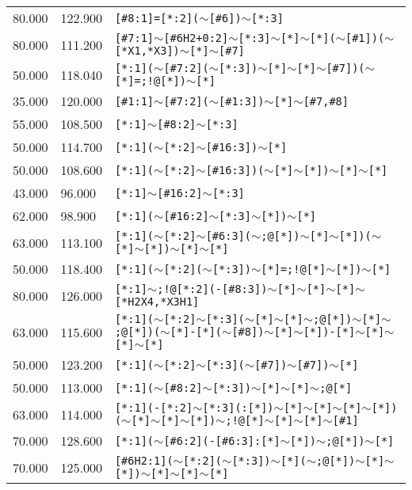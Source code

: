 \begin{longtable}{>{\baselineskip=10pt}p{} >{\baselineskip=10pt}p{} >{\baselineskip=10pt}p{}}
80.000 & 122.900 & \texttt{[\#8:1]=[*:2]($\sim$[\#6])$\sim$[*:3]} \\ 
80.000 & 111.200 & \texttt{[\#7:1]$\sim$[\#6H2+0:2]$\sim$[*:3]$\sim$[*]$\sim$[*]($\sim$[\#1])($\sim$[*X1,*X3])$\sim$[*]$\sim$[\#7]} \\ 
50.000 & 118.040 & \texttt{[*:1]($\sim$[\#7:2]($\sim$[*:3])$\sim$[*]$\sim$[*]$\sim$[\#7])($\sim$[*]=;!@[*])$\sim$[*]} \\ 
35.000 & 120.000 & \texttt{[\#1:1]$\sim$[\#7:2]($\sim$[\#1:3])$\sim$[*]$\sim$[\#7,\#8]} \\ 
55.000 & 108.500 & \texttt{[*:1]$\sim$[\#8:2]$\sim$[*:3]} \\ 
50.000 & 114.700 & \texttt{[*:1]($\sim$[*:2]$\sim$[\#16:3])$\sim$[*]} \\ 
50.000 & 108.600 & \texttt{[*:1]($\sim$[*:2]$\sim$[\#16:3])($\sim$[*]$\sim$[*])$\sim$[*]$\sim$[*]} \\ 
43.000 & 96.000 & \texttt{[*:1]$\sim$[\#16:2]$\sim$[*:3]} \\ 
62.000 & 98.900 & \texttt{[*:1]($\sim$[\#16:2]$\sim$[*:3]$\sim$[*])$\sim$[*]} \\ 
63.000 & 113.100 & \texttt{[*:1]($\sim$[*:2]$\sim$[\#6:3]($\sim$;@[*])$\sim$[*]$\sim$[*])($\sim$[*]$\sim$[*])$\sim$[*]$\sim$[*]} \\ 
50.000 & 118.400 & \texttt{[*:1]($\sim$[*:2]($\sim$[*:3])$\sim$[*]=;!@[*]$\sim$[*])$\sim$[*]} \\ 
80.000 & 126.000 & \texttt{[*:1]$\sim$;!@[*:2](-[\#8:3])$\sim$[*]$\sim$[*]$\sim$[*]$\sim$[*H2X4,*X3H1]} \\ 
63.000 & 115.600 & \texttt{[*:1]($\sim$[*:2]$\sim$[*:3]($\sim$[*]$\sim$[*]$\sim$;@[*])$\sim$[*]$\sim$;@[*])($\sim$[*]-[*]($\sim$[\#8])$\sim$[*]$\sim$[*])-[*]$\sim$[*]$\sim$[*]$\sim$[*]} \\ 
50.000 & 123.200 & \texttt{[*:1]($\sim$[*:2]$\sim$[*:3]($\sim$[\#7])$\sim$[\#7])$\sim$[*]} \\ 
50.000 & 113.000 & \texttt{[*:1]($\sim$[\#8:2]$\sim$[*:3])$\sim$[*]$\sim$[*]$\sim$;@[*]} \\ 
63.000 & 114.000 & \texttt{[*:1](-[*:2]$\sim$[*:3](:[*])$\sim$[*]$\sim$[*]$\sim$[*]$\sim$[*])($\sim$[*]$\sim$[*]$\sim$[*])$\sim$;!@[*]$\sim$[*]$\sim$[*]$\sim$[\#1]} \\ 
70.000 & 128.600 & \texttt{[*:1]($\sim$[\#6:2](-[\#6:3]:[*]$\sim$[*])$\sim$;@[*])$\sim$[*]} \\ 
70.000 & 125.000 & \texttt{[\#6H2:1]($\sim$[*:2]($\sim$[*:3])$\sim$[*]($\sim$;@[*])$\sim$[*]$\sim$[*])$\sim$[*]$\sim$[*]$\sim$[*]} \\ 

\end{longtable}
